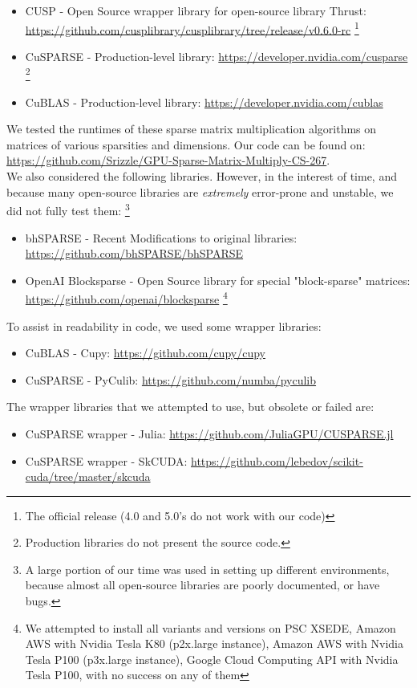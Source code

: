 \documentclass[12pt]{article}
\begin{document}
\begin{itemize}
\item CUSP - Open Source wrapper library for open-source library Thrust: \url{https://github.com/cusplibrary/cusplibrary/tree/release/v0.6.0-rc} \footnote{The official release (4.0 and 5.0's do not work with our code) }
\item CuSPARSE - Production-level library: \url{https://developer.nvidia.com/cusparse} \footnote{Production libraries do not present the source code.}
\item CuBLAS - Production-level library: \url{https://developer.nvidia.com/cublas}
\end{itemize}
\hspace{0.5cm}We tested the runtimes of these sparse matrix multiplication algorithms on matrices of various sparsities and dimensions. Our code can be found on: \url{https://github.com/Srizzle/GPU-Sparse-Matrix-Multiply-CS-267}.\\ We also considered the following libraries. However, in the interest of time, and because many open-source libraries are \textit{extremely} error-prone and unstable, we did not fully test them: \footnote{A large portion of our time was used in setting up different environments, because almost all open-source libraries are poorly documented, or have bugs.}
\begin{itemize}
\item bhSPARSE - Recent Modifications to original libraries: \url{https://github.com/bhSPARSE/bhSPARSE}
\item OpenAI Blocksparse - Open Source library for special "block-sparse" matrices: \url{https://github.com/openai/blocksparse} \footnote{We attempted to install all variants and versions on PSC XSEDE, Amazon AWS with Nvidia Tesla K80 (p2x.large instance), Amazon AWS with Nvidia Tesla P100 (p3x.large instance), Google Cloud Computing API with Nvidia Tesla P100, with no success on any of them}
\end{itemize}

To assist in readability in code, we used some wrapper libraries:
\begin{itemize}
\item CuBLAS - Cupy: \url{https://github.com/cupy/cupy}
\item CuSPARSE - PyCulib: \url{https://github.com/numba/pyculib}
\end{itemize}

The wrapper libraries that we attempted to use, but obsolete or failed are:
\begin{itemize}
\item CuSPARSE wrapper - Julia: \url{https://github.com/JuliaGPU/CUSPARSE.jl}
\item CuSPARSE wrapper - SkCUDA: \url{https://github.com/lebedov/scikit-cuda/tree/master/skcuda}
\end{itemize}
\end{document}
